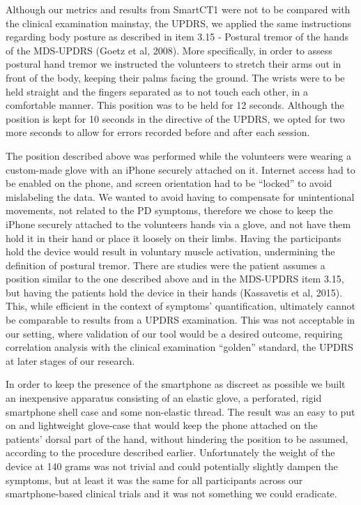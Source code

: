 Although our metrics and results from \gls{SmartCT1} were not to be compared with the clinical examination mainstay, the \gls{UPDRS}, we applied the same instructions regarding body posture as described in item 3.15 - Postural tremor of the hands of the \gls{MDS}-\gls{UPDRS} (Goetz et al, 2008). More specifically, in order to assess postural hand tremor we instructed the volunteers to stretch their arms out in front of the body, keeping their palms facing the ground. The wrists were to be held straight and the fingers separated as to not touch each other, in a comfortable manner. This position was to be held for 12 seconds. Although the position is kept for 10 seconds in the directive of the \gls{UPDRS}, we opted for two more seconds to allow for errors recorded before and after each session. 

The position described above was performed while the volunteers were wearing a custom-made glove with an iPhone securely attached on it. Internet access had to be enabled on the phone, and screen orientation had to be ``locked'' to avoid mislabeling the data. We wanted to avoid having to compensate for unintentional movements, not related to the \gls{PD} symptoms, therefore we chose to keep the iPhone securely attached to the volunteers hands via a glove, and not have them hold it in their hand or place it loosely on their limbs. Having the participants hold the device would result in voluntary muscle activation, undermining the definition of postural tremor. There are studies were the patient assumes a position similar to the one described above and in the \gls{MDS}-\gls{UPDRS} item 3.15, but having the patients hold the device in their hands (Kassavetis et al, 2015). This, while efficient in the context of symptoms' quantification, ultimately cannot be comparable to results from a \gls{UPDRS} examination. This was not acceptable in our setting, where validation of our tool would be a desired outcome, requiring correlation analysis with the clinical examination ``golden'' standard, the \gls{UPDRS} at later stages of our research. 

In order to keep the presence of the smartphone as discreet as possible we built an inexpensive apparatus consisting of an elastic glove, a perforated, rigid smartphone shell case and some non-elastic thread. The result was an easy to put on and lightweight glove-case that would keep the phone attached on the patients' dorsal part of the hand, without hindering the position to be assumed, according to the procedure described earlier. Unfortunately the weight of the device at 140 grams was not trivial and could potentially slightly dampen the symptoms, but at least it was the same for all participants across our smartphone-based clinical trials and it was not something we could eradicate. 

